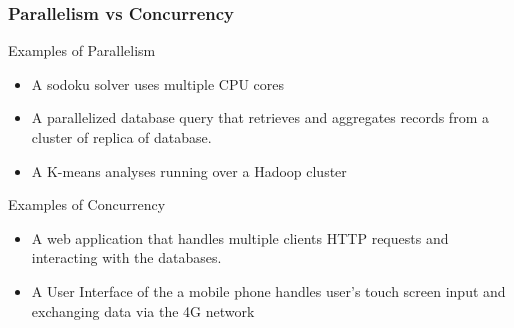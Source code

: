 \documentclass{beamer}
\begin{document}
\begin{frame}[fragile]
\frametitle{Parallelism vs Concurrency}

Examples of Parallelism 
\begin{itemize} 
 \item A sodoku solver uses multiple CPU cores
 \item A parallelized database query that retrieves and aggregates records from a
   cluster of replica of database.
 \item A K-means analyses running over a Hadoop cluster
\end{itemize}

Examples of Concurrency
\begin{itemize}
 \item A web application that handles multiple clients HTTP requests
   and interacting with the databases.
 \item A User Interface of the a mobile phone handles user's touch screen input
   and exchanging data via the 4G network
\end{itemize}

\end{frame}


\end{document}
